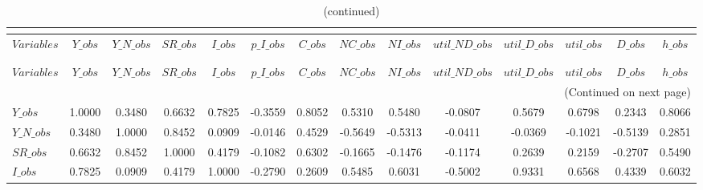  
\begin{center}
\begin{longtable}{lccccccccccccc} 
\caption{MATRIX OF CORRELATIONS}\\
 \label{Table:th_corr_matrix}\\
\toprule 
$Variables      $	 & 	 $          Y\_obs$	 & 	 $      Y\_N\_obs$	 & 	 $         SR\_obs$	 & 	 $          I\_obs$	 & 	 $      p\_I\_obs$	 & 	 $          C\_obs$	 & 	 $         NC\_obs$	 & 	 $         NI\_obs$	 & 	 $  util\_ND\_obs$	 & 	 $   util\_D\_obs$	 & 	 $       util\_obs$	 & 	 $          D\_obs$	 & 	 $          h\_obs$\\
\midrule \endfirsthead 
\caption{(continued)}\\
 \toprule \\ 
$Variables      $	 & 	 $          Y\_obs$	 & 	 $      Y\_N\_obs$	 & 	 $         SR\_obs$	 & 	 $          I\_obs$	 & 	 $      p\_I\_obs$	 & 	 $          C\_obs$	 & 	 $         NC\_obs$	 & 	 $         NI\_obs$	 & 	 $  util\_ND\_obs$	 & 	 $   util\_D\_obs$	 & 	 $       util\_obs$	 & 	 $          D\_obs$	 & 	 $          h\_obs$\\
\midrule \endhead 
\midrule \multicolumn{14}{r}{(Continued on next page)} \\ \bottomrule \endfoot 
\bottomrule \endlastfoot 
$Y\_obs         $	 & 	           1.0000	 & 	           0.3480	 & 	           0.6632	 & 	           0.7825	 & 	          -0.3559	 & 	           0.8052	 & 	           0.5310	 & 	           0.5480	 & 	          -0.0807	 & 	           0.5679	 & 	           0.6798	 & 	           0.2343	 & 	           0.8066 \\ 
$Y\_N\_obs      $	 & 	           0.3480	 & 	           1.0000	 & 	           0.8452	 & 	           0.0909	 & 	          -0.0146	 & 	           0.4529	 & 	          -0.5649	 & 	          -0.5313	 & 	          -0.0411	 & 	          -0.0369	 & 	          -0.1021	 & 	          -0.5139	 & 	           0.2851 \\ 
$SR\_obs        $	 & 	           0.6632	 & 	           0.8452	 & 	           1.0000	 & 	           0.4179	 & 	          -0.1082	 & 	           0.6302	 & 	          -0.1665	 & 	          -0.1476	 & 	          -0.1174	 & 	           0.2639	 & 	           0.2159	 & 	          -0.2707	 & 	           0.5490 \\ 
$I\_obs         $	 & 	           0.7825	 & 	           0.0909	 & 	           0.4179	 & 	           1.0000	 & 	          -0.2790	 & 	           0.2609	 & 	           0.5485	 & 	           0.6031	 & 	          -0.5002	 & 	           0.9331	 & 	           0.6568	 & 	           0.4339	 & 	           0.6032 \\ 

\end{longtable}
\end{center}
